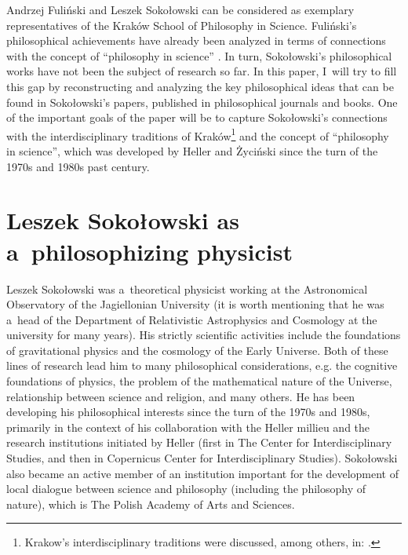 \documentclass[%
  manuscript=article,
  year=2024,
  volume=77,
  doi=10.59203/zfn.77.689,
]{zfn}
\begin{document}
Andrzej Fuliński and Leszek Sokołowski can be considered as exemplary representatives of the Kraków School of Philosophy in Science. Fuliński's philosophical achievements have already been analyzed in terms of connections with the concept of ``philosophy in science'' 
\parencite[][]{Trombik2023Andrzej}. %
 In turn, Sokołowski's philosophical works have not been the subject of research so far. In this paper, I~will try to fill this gap by reconstructing and analyzing the key philosophical ideas that can be found in Sokołowski's papers, published in philosophical journals and books. One of the important goals of the paper will be to capture Sokołowski's connections with the interdisciplinary traditions of Kraków\footnote{Krakow's interdisciplinary traditions were discussed, among others, in: 
\parencites[][]{Polak201119th}[][]{Polak2018Tradycja}.%
} and the concept of ``philosophy in science'', which was developed by Heller and Życiński since the turn of the 1970s and 1980s past century.



\section{Leszek Sokołowski as a~philosophizing physicist}

Leszek Sokołowski was a~theoretical physicist working at the Astronomical Observatory of the Jagiellonian University (it is worth mentioning that he was a~head of the Department of Relativistic Astrophysics and Cosmology at the university for many years). His strictly scientific activities include the foundations of gravitational physics and the cosmology of the Early Universe. Both of these lines of research lead him to many philosophical considerations, e.g. the cognitive foundations of physics, the problem of the mathematical nature of the Universe, relationship between science and religion, and many others. He has been developing his philosophical interests since the turn of the 1970s and 1980s, primarily in the context of his collaboration with the Heller millieu and the research institutions initiated by Heller (first in The Center for Interdisciplinary Studies, and then in Copernicus Center for Interdisciplinary Studies). Sokołowski also became an active member of an institution important for the development of local dialogue between science and philosophy (including the philosophy of nature), which is The Polish Academy of Arts and Sciences.
\end{document}
